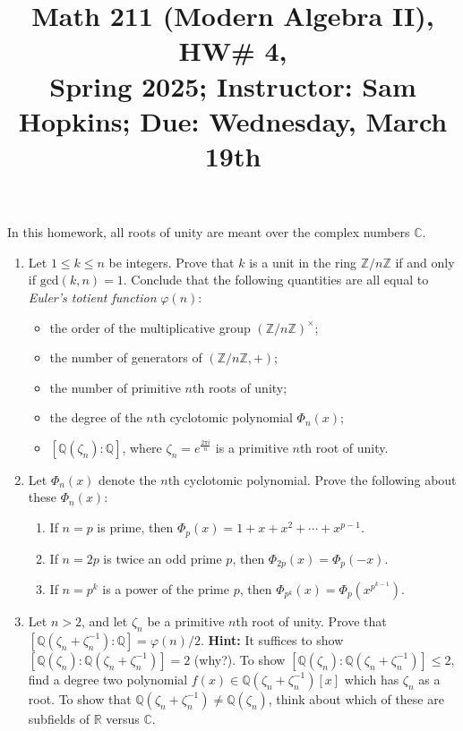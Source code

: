 \documentclass[11pt]{article}
\title{Math 211 (Modern Algebra II), HW\# 4, \\ {\normalsize Spring 2025; Instructor: Sam Hopkins; Due: Wednesday, March 19th}}
\date{}
\begin{document}
\maketitle

\thispagestyle{empty}

In this homework, all roots of unity are meant over the complex numbers $\mathbb{C}$.

\begin{enumerate}

\item Let $1 \leq k \leq n$ be integers. Prove that $k$ is a unit in the ring $\mathbb{Z}/n\mathbb{Z}$ if and only if $\mathrm{gcd}(k,n)=1$. Conclude that the following quantities are all equal to \emph{Euler's totient function} $\varphi(n)$:
\begin{itemize}
\item the order of the multiplicative group $(\mathbb{Z}/n\mathbb{Z})^{\times}$;
\item the number of generators of $(\mathbb{Z}/n\mathbb{Z},+)$;
\item the number of primitive $n$th roots of unity;
\item the degree of the $n$th cyclotomic polynomial $\Phi_n(x)$;
\item $[\mathbb{Q}(\zeta_n)\colon\mathbb{Q}]$, where $\zeta_n=e^{\frac{2\pi i}{n}}$ is a primitive $n$th root of unity.
\end{itemize}

\item Let $\Phi_n(x)$ denote the $n$th cyclotomic polynomial. Prove the following about these $\Phi_n(x)$:
\begin{enumerate}
\item If $n=p$ is prime, then $\Phi_p(x) = 1+x+x^2+\cdots+x^{p-1}$.
\item If $n=2p$ is twice an odd prime $p$, then $\Phi_{2p}(x) = \Phi_p(-x)$.
\item If $n=p^k$ is a power of the prime $p$, then $\Phi_{p^k}(x) = \Phi_{p}(x^{p^{k-1}})$.
\end{enumerate}

\item Let $n > 2$, and let $\zeta_n$ be a primitive $n$th root of unity. Prove that $[\mathbb{Q}(\zeta_n+\zeta_n^{-1}):\mathbb{Q}] = \varphi(n)/2$. {\bf Hint:} It suffices to show $[\mathbb{Q}(\zeta_n):\mathbb{Q}(\zeta_n+\zeta_n^{-1})]=2$ (why?). To show $[\mathbb{Q}(\zeta_n):\mathbb{Q}(\zeta_n+\zeta_n^{-1})] \leq 2$, find a degree two polynomial $f(x) \in \mathbb{Q}(\zeta_n+\zeta_n^{-1})[x]$ which has $\zeta_n$ as a root. To show that $\mathbb{Q}(\zeta_n+\zeta_n^{-1}) \neq \mathbb{Q}(\zeta_n)$, think about which of these are subfields of $\mathbb{R}$ versus $\mathbb{C}$.


\end{enumerate}
\end{document}
